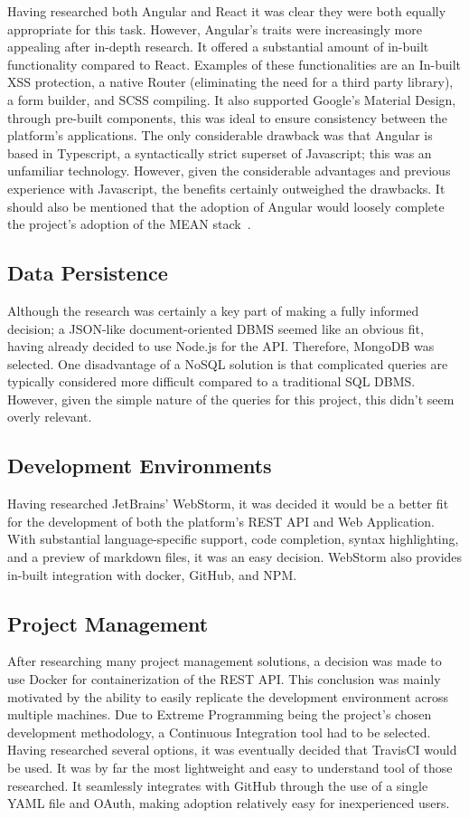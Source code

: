 Having researched both Angular and React it was clear they were both equally appropriate for this task. However, Angular's traits were increasingly more appealing after in-depth research. It offered a substantial amount of in-built functionality compared to React. Examples of these functionalities are an In-built XSS protection, a native Router (eliminating the need for a third party library), a form builder, and SCSS compiling. It also supported Google's Material Design, through pre-built components, this was ideal to ensure consistency between the platform's applications. The only considerable drawback was that Angular is based in Typescript, a syntactically strict superset of Javascript; this was an unfamiliar technology. However, given the considerable advantages and previous experience with Javascript, the benefits certainly outweighed the drawbacks. It should also be mentioned that the adoption of Angular would loosely complete the project's adoption of the MEAN stack~\cite{mean_documentation_ref}.

\subsection{Data Persistence}
Although the research was certainly a key part of making a fully informed decision; a JSON-like document-oriented DBMS seemed like an obvious fit, having already decided to use Node.js for the API. Therefore, MongoDB was selected.  One disadvantage of a NoSQL solution is that complicated queries are typically considered more difficult compared to a traditional SQL DBMS. However, given the simple nature of the queries for this project, this didn't seem overly relevant. 

\subsection{Development Environments}
Having researched JetBrains' WebStorm, it was decided it would be a better fit for the development of both the platform's REST API and Web Application. With substantial language-specific support, code completion, syntax highlighting, and a preview of markdown files, it was an easy decision. WebStorm also provides in-built integration with docker, GitHub, and NPM.

\subsection{Project Management}
After researching many project management solutions, a decision was made to use Docker for containerization of the REST API. This conclusion was mainly motivated by the ability to easily replicate the development environment across multiple machines. Due to Extreme Programming being the project's chosen development methodology, a Continuous Integration tool had to be selected. Having researched several options, it was eventually decided that TravisCI would be used. It was by far the most lightweight and easy to understand tool of those researched. It seamlessly integrates with GitHub through the use of a single YAML file and OAuth, making adoption relatively easy for inexperienced users.

